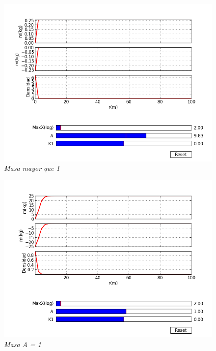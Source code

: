 \documentclass[12pt]{book}
\begin{document}
\begin{figure}[!h]
 \centering
 \includegraphics[scale=0.7]{masa4.png}
 \caption{\emph{Masa mayor que 1 }}
 \label{Fig: 1}
\end{figure}


\begin{figure}[!h]
 \centering
 \includegraphics[scale=0.7]{masa1.png}
 \caption{\emph{Masa A = 1}}
 \label{Fig: 1}
\end{figure}
\end{document}
